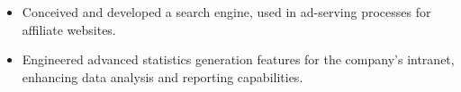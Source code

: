 \begin{minipage}{\linewidth}
\begin{itemize}
  \item Conceived and developed a search engine, used in ad-serving processes for affiliate websites. 
  \item Engineered advanced statistics generation features for the company’s intranet, enhancing data analysis and reporting capabilities.
\end{itemize}
\end{minipage}
\divider
